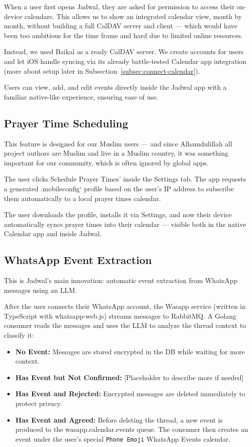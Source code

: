 When a user first opens Jadwal, they are asked for permission to access their on-device calendars. This allows us to show an integrated calendar view, month by month, without building a full CalDAV server and client — which would have been too ambitious for the time frame and hard due to limited online resources.

Instead, we used Baikal as a ready CalDAV server. We create accounts for users and let iOS handle syncing via its already battle-tested Calendar app integration (more about setup later in Subsection~\ref{subsec:connect-calendar}).

Users can view, add, and edit events directly inside the Jadwal app with a familiar native-like experience, ensuring ease of use.

\subsection{Prayer Time Scheduling} \label{subsec:schedule-prayer-times}

This feature is designed for our Muslim users — and since Alhamdulillah all project authors are Muslim and live in a Muslim country, it was something important for our community, which is often ignored by global apps.

The user clicks Schedule Prayer Times' inside the Settings tab. The app requests a generated .mobileconfig` profile based on the user's IP address to subscribe them automatically to a local prayer times calendar.

The user downloads the profile, installs it via Settings, and now their device automatically syncs prayer times into their calendar — visible both in the native Calendar app and inside Jadwal.

\subsection{WhatsApp Event Extraction} \label{subsec:whatsapp-event-extraction}

This is Jadwal's main innovation: automatic event extraction from WhatsApp messages using an LLM.

After the user connects their WhatsApp account, the Wasapp service (written in TypeScript with whatsapp-web.js) streams messages to RabbitMQ. A Golang consumer reads the messages and uses the LLM to analyze the thread context to classify it:

\begin{itemize} \item \textbf{No Event:} Messages are stored encrypted in the DB while waiting for more context. \item \textbf{Has Event but Not Confirmed:} [Placeholder to describe more if needed] \item \textbf{Has Event and Rejected:} Encrypted messages are deleted immediately to protect privacy. \item \textbf{Has Event and Agreed:} Before deleting the thread, a new event is produced to the wasapp.calendar.events queue. The consumer then creates an event under the user’s special \texttt{Phone Emoji} WhatsApp Events calendar. \end{itemize}

